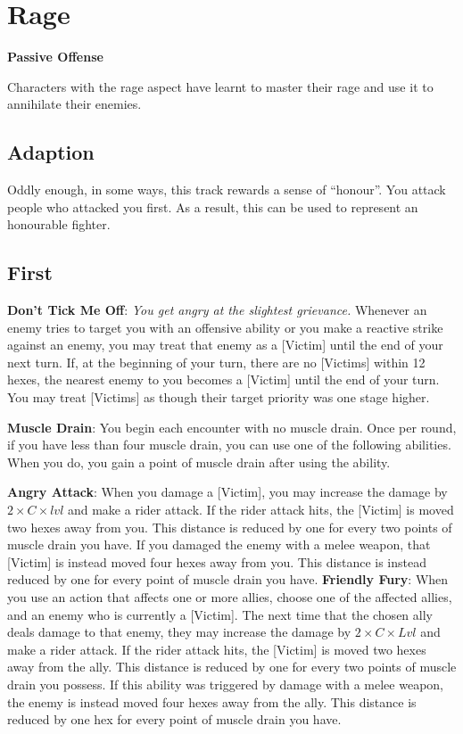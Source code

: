 \section{Rage}
\textbf{Passive Offense}

Characters with the rage aspect have learnt to master their rage and use it to annihilate their enemies.

\subsection*{Adaption}
Oddly enough, in some ways, this track rewards a sense of ``honour''. You attack people who attacked you first. As a result, this can be used to represent an honourable fighter.



\begin{multicols*}{2}
\subsection*{First \Facet\perk}
\textbf{Don't Tick Me Off}: \emph{You get angry at the slightest grievance.} Whenever an enemy tries to target you with an offensive ability or you make a reactive strike against an enemy, you may treat that enemy as a [Victim] until the end of your next turn. If, at the beginning of your turn, there are no [Victims] within 12 hexes, the nearest enemy to you becomes a [Victim] until the end of your turn. You may treat [Victims] as though their target priority was one stage higher.

\textbf{Muscle Drain}: You begin each encounter with no muscle drain. Once per round, if you have less than four muscle drain, you can use one of the following abilities. When you do, you gain a point of muscle drain after using the ability.
\begin{itemize}
\thing \textbf{Angry Attack}: When you damage a [Victim], you may increase the damage by $2 \times C \times lvl$ and make a rider attack. If the rider attack hits, the [Victim] is moved two hexes away from you. This distance is reduced by one for every two points of muscle drain you have. If you damaged the enemy with a melee weapon, that [Victim] is instead moved four hexes away from you. This distance is instead reduced by one for every point of muscle drain you have. 
\thing \textbf{Friendly Fury}: When you use an action that affects one or more allies, choose one of the affected allies, and an enemy who is currently a [Victim]. The next time that the chosen ally deals damage to that enemy, they may increase the damage by $2 \times C \times Lvl$ and make a rider attack. If the rider attack hits, the [Victim] is moved two hexes away from the ally. This distance is reduced by one for every two points of muscle drain you possess. If this ability was triggered by damage with a melee weapon, the enemy is instead moved four hexes away from the ally. This distance is reduced by one hex for every point of muscle drain you have.
\end{itemize}


\end{multicols*}
